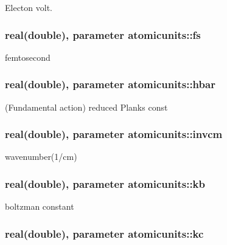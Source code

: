 Electon volt. 

\hypertarget{classatomicunits_a51f9c61f64f3aec674dd6dbb342e733d}{
\subsubsection[{fs}]{\setlength{\rightskip}{0pt plus 5cm}real(double), parameter atomicunits\-::fs}}\label{classatomicunits_a51f9c61f64f3aec674dd6dbb342e733d}


femtosecond 

\hypertarget{classatomicunits_a7dffaade5d28d129a3726e8eff794447}{
\subsubsection[{hbar}]{\setlength{\rightskip}{0pt plus 5cm}real(double), parameter atomicunits\-::hbar}}\label{classatomicunits_a7dffaade5d28d129a3726e8eff794447}


(Fundamental action) reduced Planks const 

\hypertarget{classatomicunits_a1741cd0f8cdd696033c1c18531740795}{
\subsubsection[{invcm}]{\setlength{\rightskip}{0pt plus 5cm}real(double), parameter atomicunits\-::invcm}}\label{classatomicunits_a1741cd0f8cdd696033c1c18531740795}


wavenumber(1/cm) 

\hypertarget{classatomicunits_afe876defe82137d91908691c6765a5f1}{
\subsubsection[{kb}]{\setlength{\rightskip}{0pt plus 5cm}real(double), parameter atomicunits\-::kb}}\label{classatomicunits_afe876defe82137d91908691c6765a5f1}


boltzman constant 

\hypertarget{classatomicunits_aafc175708d34f52459448530cdec9aae}{
\subsubsection[{kc}]{\setlength{\rightskip}{0pt plus 5cm}real(double), parameter atomicunits\-::kc}}\label{classatomicunits_aafc175708d34f52459448530cdec9aae}


